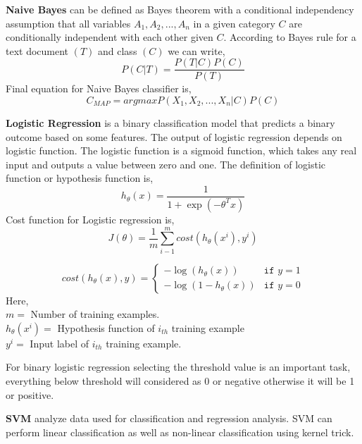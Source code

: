 \vspace{0.3cm}
\textbf{Naive Bayes}\cite{yoo2015classification} can be defined as Bayes theorem with a conditional independency assumption that all variables $A_{1},A_{2},...,A_{n}$ in a given category $C$ are conditionally independent with each other given $C$. 
According to Bayes rule for a text document $(T)$ and class $(C)$ we can write,
\begin{equation}
    P(C|T) = \frac{P(T|C)P(C)}{P(T)}
\end{equation}
Final equation for Naive Bayes classifier is,
\begin{equation}
     C_{MAP} = argmax P(X_{1},X_{2},...,X_{n}|C)P(C)
\end{equation}
\vspace{0.1cm}

\textbf{Logistic Regression}\cite{sharma2015active} is a binary classification model that predicts a binary outcome based on some features. The output of logistic regression depends on logistic function. The logistic function is a sigmoid function, which takes any real input and outputs a value between zero and one. The definition of logistic function or hypothesis function is,
\begin{equation}
    h_{\theta}(x) =  \frac{1}{1+\exp({-\theta^T x})}
\end{equation}
Cost function for Logistic regression is,
\begin{equation}
    J(\theta) = \frac{1}{m}\sum_{i-1}^{m}cost(h_{\theta}(x^{i}),y^{i})   
\end{equation}

\[
cost(h_{\theta}(x), y) = 
\begin{cases}
    -\log (h_{\theta}(x)) & \texttt{if } y = 1\\
     -\log (1-h_{\theta}(x)) & \texttt{if } y = 0
\end{cases}
\]
Here,\\
$m = $ Number of training examples.\\
$h_{\theta}(x^{i}) = $ Hypothesis function of $i_{th}$ training example\\
$y^i = $ Input label of $i_{th}$ training example.
\vspace{0.1cm}
\par
For binary logistic regression selecting
the threshold value is an important task, everything below threshold will considered as 0 or negative otherwise it will be 1 or positive.

\vspace{0.3cm}
\textbf{SVM}\cite{wei2012text} analyze data used for classification and regression analysis. SVM can perform linear classification as well as non-linear classification using kernel trick.

